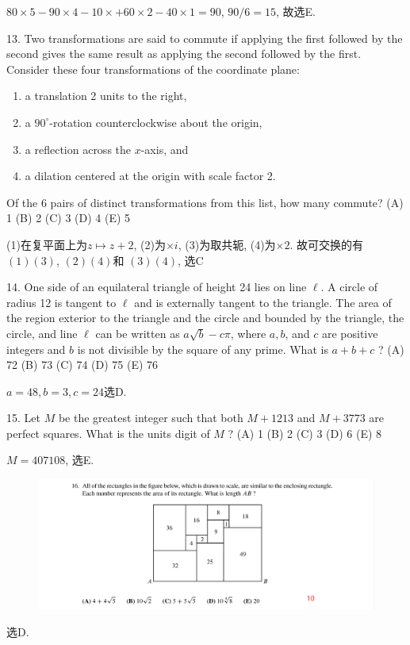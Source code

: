 \documentclass[12pt,a4paper]{article}
\newenvironment{enu}{\begin{enumerate}[(1)]}{\end{enumerate}}
\theoremstyle{definition}
\begin{document}
$80\times 5-90\times 4-10\times +60\times 2-40\times 1=90$, $90/6=15$, 故选E. 

13. Two transformations are said to commute if applying the first followed by the second gives the same result as applying the second followed by the first. Consider these four transformations of the coordinate plane:
\begin{enu} 
\item a translation 2 units to the right,
\item a $90^{\circ}$-rotation counterclockwise about the origin,
\item a reflection across the $x$-axis, and
\item a dilation centered at the origin with scale factor 2.
\end{enu}
Of the 6 pairs of distinct transformations from this list, how many commute?
(A) 1
(B) 2
(C) 3
(D) 4
(E) 5

(1)在复平面上为$z\mapsto z+2$, (2)为$\times i$, (3)为取共轭, (4)为$\times2$. 故可交换的有
$(1)(3)$, $(2)(4)$和 $(3)(4)$, 选C 

14. One side of an equilateral triangle of height 24 lies on line $\ell$. A circle of radius 12 is tangent to $\ell$ and is externally tangent to the triangle. The area of the region exterior to the triangle and the circle and bounded by the triangle, the circle, and line $\ell$ can be written as $a \sqrt{b}-c \pi$, where $a, b$, and $c$ are positive integers and $b$ is not divisible by the square of any prime. What is $a+b+c$ ?
(A) 72
(B) 73
(C) 74
(D) 75
(E) 76

$a=48,b=3,c=24$选D. 

15. Let $M$ be the greatest integer such that both $M+1213$ and $M+3773$ are perfect squares. What is the units digit of $M$ ?
(A) 1 (B) 2 (C) 3 (D) 6 (E) 8

$M=407108$, 选E. 

\begin{figure}[H]
    \includegraphics[height=0.3\textheight]{16.png}
\end{figure}
选D.
\end{document}
